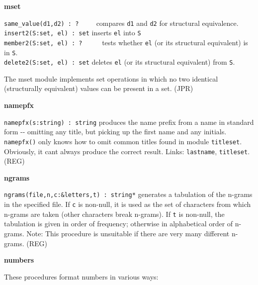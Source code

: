{\sffamily\bfseries
mset}

\texttt{same\_value(d1,d2) : ? \ }\ \ \ compares \texttt{d1} and
\texttt{d2} for structural equivalence.\\
\texttt{insert2(S:set, el) : set} inserts \texttt{el} into \texttt{S}
\\
\texttt{member2(S:set, el) : ?} \ \ \ \ \ tests whether \texttt{el} (or
its structural equivalent) is in \texttt{S}.\\
\texttt{delete2(S:set, el) : set} deletes \texttt{el} (or its structural
equivalent) from \texttt{S}.

The mset module implements set operations in which no two identical
(structurally equivalent) values can be present in a set. (JPR)

{\sffamily\bfseries
namepfx}

\texttt{namepfx(s:string) : string} produces the {\textquotedbl}name
prefix{\textquotedbl} from a name in standard form -{}- omitting any
title, but picking up the first name and any initials.
\texttt{namepfx()} only knows how to omit common titles found in module
\texttt{titleset}. Obviously, it can{\textquotesingle}t always produce
the {\textquotedbl}correct{\textquotedbl} result. Links:
\texttt{lastname}, \texttt{titleset}. (REG)

{\sffamily\bfseries
ngrams}

\texttt{ngrams(file,n,c:\&letters,t) : string*} generates a tabulation
of the n-grams in the specified file. If \texttt{c} is non-null, it is
used as the set of characters from which n-grams are
taken (other characters break n-grams). If \texttt{t} is non-null, the
tabulation is given in order of frequency; otherwise in alphabetical
order of n-grams. Note: This procedure is unsuitable if there are very
many different n-grams. (REG)

{\sffamily\bfseries
numbers}

These procedures format numbers in various ways:

